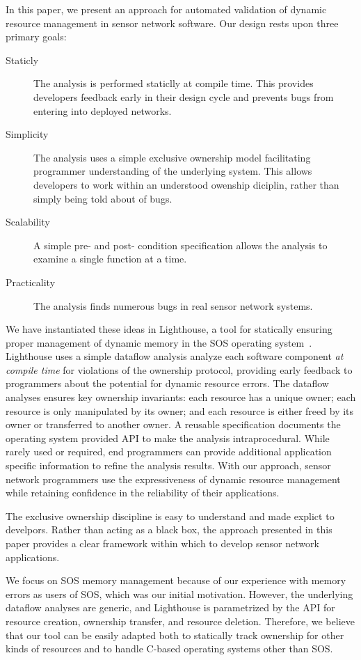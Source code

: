 In this paper, we present an approach for automated validation of dynamic
resource management in sensor network software.  
%
Our design rests upon three primary goals:
%
\begin{description}
%
\item[Staticly] The analysis is performed staticlly at compile time.  This
provides developers feedback early in their design cycle and prevents bugs
from entering into deployed networks.
%
\item[Simplicity]  The analysis uses a simple exclusive ownership model
facilitating programmer understanding of the underlying system.  
%
This allows developers to work within an understood owenship diciplin, rather
than simply being told about of bugs.
%
\item[Scalability]  A simple pre- and post- condition specification allows the
analysis to examine a single function at a time.
%
\item[Practicality] The analysis finds numerous bugs in real sensor network
systems.
%
\end{description}
%



We have instantiated these ideas in Lighthouse, a tool for statically
ensuring proper management of dynamic memory in the SOS operating
system~\cite{sos}.  
%
Lighthouse uses a simple dataflow analysis analyze each software component
{\em at compile time} for violations of the ownership protocol, providing
early feedback to programmers about the potential for dynamic resource
errors.  
%
The dataflow analyses ensures key ownership invariants:  each resource has a
unique owner; each resource is only manipulated by its owner; and each
resource is either freed by its owner or transferred to another owner.  
%
A reusable specification documents the operating system provided API to make
the analysis intraprocedural.
%
While rarely used or required, end programmers can provide additional
application specific information to refine the analysis results.
%
With our approach, sensor network programmers use the expressiveness of
dynamic resource management while retaining confidence in the reliability of
their applications.



The exclusive ownership discipline is easy to understand and made explict to
develpors.
%
Rather than acting as a black box, the approach presented in this paper
provides a clear framework within which to develop sensor network
applications.


We focus on SOS memory management because of our experience with memory
errors as users of SOS, which was our initial motivation.  
%
%
However, the underlying dataflow analyses are generic, and Lighthouse is
parametrized by the API for resource creation, ownership transfer, and
resource deletion.  
%
Therefore, we believe that our tool can be easily adapted both to statically
track ownership for other kinds of resources and to handle C-based operating
systems other than SOS.


